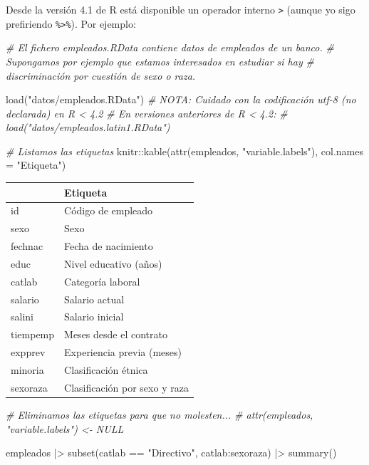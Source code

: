 \documentclass[
]{book}
\newenvironment{Shaded}{\begin{snugshade}}{\end{snugshade}}
\newcommand{\AttributeTok}[1]{\textcolor[rgb]{0.77,0.63,0.00}{#1}}
\newcommand{\CommentTok}[1]{\textcolor[rgb]{0.56,0.35,0.01}{\textit{#1}}}
\newcommand{\FunctionTok}[1]{\textcolor[rgb]{0.00,0.00,0.00}{#1}}
\newcommand{\NormalTok}[1]{#1}
\newcommand{\SpecialCharTok}[1]{\textcolor[rgb]{0.00,0.00,0.00}{#1}}
\newcommand{\StringTok}[1]{\textcolor[rgb]{0.31,0.60,0.02}{#1}}
\theoremstyle{break}
\theoremstyle{nonumberplain}
\begin{document}
Desde la versión 4.1 de R está disponible un operador interno \texttt{\textbar{}\textgreater{}} (aunque yo sigo prefiriendo \texttt{\%\textgreater{}\%}).
Por ejemplo:

\begin{Shaded}
\begin{Highlighting}[]
\CommentTok{\# El fichero \textquotesingle{}empleados.RData\textquotesingle{} contiene datos de empleados de un banco.}
\CommentTok{\# Supongamos por ejemplo que estamos interesados en estudiar si hay}
\CommentTok{\# discriminación por cuestión de sexo o raza.}

\FunctionTok{load}\NormalTok{(}\StringTok{"datos/empleados.RData"}\NormalTok{)}
\CommentTok{\# NOTA: Cuidado con la codificación utf{-}8 (no declarada) en R \textless{} 4.2 }
\CommentTok{\# En versiones anteriores de R \textless{} 4.2: }
\CommentTok{\# load("datos/empleados.latin1.RData")}

\CommentTok{\# Listamos las etiquetas}
\NormalTok{knitr}\SpecialCharTok{::}\FunctionTok{kable}\NormalTok{(}\FunctionTok{attr}\NormalTok{(empleados, }\StringTok{"variable.labels"}\NormalTok{), }\AttributeTok{col.names =} \StringTok{"Etiqueta"}\NormalTok{)}
\end{Highlighting}
\end{Shaded}

\begin{tabular}{l|l}
\hline
  & Etiqueta\\
\hline
id & Código de empleado\\
\hline
sexo & Sexo\\
\hline
fechnac & Fecha de nacimiento\\
\hline
educ & Nivel educativo  (años)\\
\hline
catlab & Categoría laboral\\
\hline
salario & Salario actual\\
\hline
salini & Salario inicial\\
\hline
tiempemp & Meses desde el contrato\\
\hline
expprev & Experiencia previa (meses)\\
\hline
minoria & Clasificación étnica\\
\hline
sexoraza & Clasificación por sexo y raza\\
\hline
\end{tabular}

\begin{Shaded}
\begin{Highlighting}[]
\CommentTok{\# Eliminamos las etiquetas para que no molesten...}
\CommentTok{\# attr(empleados, "variable.labels") \textless{}{-} NULL  }

\NormalTok{empleados }\SpecialCharTok{|\textgreater{}}  \FunctionTok{subset}\NormalTok{(catlab }\SpecialCharTok{==} \StringTok{"Directivo"}\NormalTok{, catlab}\SpecialCharTok{:}\NormalTok{sexoraza) }\SpecialCharTok{|\textgreater{}}  \FunctionTok{summary}\NormalTok{()}
\end{Highlighting}
\end{Shaded}
\end{document}
